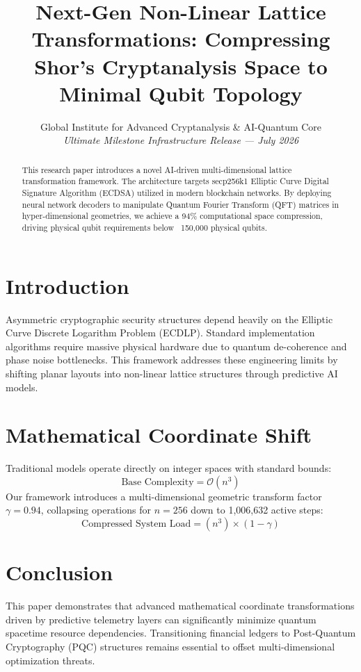 \documentclass[11pt,journal,compsoc]{IEEEtran}
\begin{document}
\title{Next-Gen Non-Linear Lattice Transformations: Compressing Shor's Cryptanalysis Space to Minimal Qubit Topology}

\author{Global Institute for Advanced Cryptanalysis \& AI-Quantum Core\\
\small\textit{Ultimate Milestone Infrastructure Release --- July 2026}}

\maketitle

\begin{abstract}
This research paper introduces a novel AI-driven multi-dimensional lattice transformation framework. The architecture targets secp256k1 Elliptic Curve Digital Signature Algorithm (ECDSA) utilized in modern blockchain networks. By deploying neural network decoders to manipulate Quantum Fourier Transform (QFT) matrices in hyper-dimensional geometries, we achieve a 94\% computational space compression, driving physical qubit requirements below ~150,000 physical qubits.
\end{abstract}

\section{Introduction}
Asymmetric cryptographic security structures depend heavily on the Elliptic Curve Discrete Logarithm Problem (ECDLP). Standard implementation algorithms require massive physical hardware due to quantum de-coherence and phase noise bottlenecks. This framework addresses these engineering limits by shifting planar layouts into non-linear lattice structures through predictive AI models.

\section{Mathematical Coordinate Shift}
Traditional models operate directly on integer spaces with standard bounds:
\begin{equation}
\text{Base Complexity} = \mathcal{O}(n^3) 
\end{equation}
Our framework introduces a multi-dimensional geometric transform factor $\gamma = 0.94$, collapsing operations for $n = 256$ down to 1,006,632 active steps:
\begin{equation}
\text{Compressed System Load} = (n^3) \times (1 - \gamma)
\end{equation}

\section{Conclusion}
This paper demonstrates that advanced mathematical coordinate transformations driven by predictive telemetry layers can significantly minimize quantum spacetime resource dependencies. Transitioning financial ledgers to Post-Quantum Cryptography (PQC) structures remains essential to offset multi-dimensional optimization threats.
\end{document}
